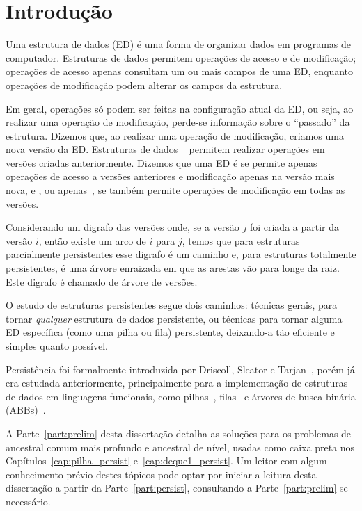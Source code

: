 \documentclass[main.tex]{subfiles}
\begin{document}
\setcounter{secnumdepth}{0}

\chapter*{Introdução}

Uma estrutura de dados (ED) é uma forma de organizar dados em programas de computador. Estruturas de dados permitem operações de acesso e de modificação; operações de acesso apenas consultam um ou mais campos de uma ED, enquanto operações de modificação podem alterar os campos da estrutura.

Em geral, operações só podem ser feitas na configuração atual da ED, ou seja, ao realizar uma operação de modificação, perde-se informação sobre o ``passado'' da estrutura. Dizemos que, ao realizar uma operação de modificação, criamos uma nova versão da ED. Estruturas de dados ~\cite{DriscollSST1989} permitem realizar operações em versões criadas anteriormente. Dizemos que uma ED é  se permite apenas operações de acesso a versões anteriores e modificação apenas na versão mais nova, e , ou apenas~, se também permite operações de modificação em todas as versões.

Considerando um digrafo das versões onde, se a versão $j$ foi criada a partir da versão $i$, então existe um arco de $i$ para $j$, temos que para estruturas parcialmente persistentes esse digrafo é um caminho e, para estruturas totalmente persistentes, é uma árvore enraizada em que as arestas vão para longe da raiz. Este digrafo é chamado de árvore de versões.

O estudo de estruturas persistentes segue dois caminhos: técnicas gerais, para tornar \emph{qualquer} estrutura de dados persistente, ou técnicas para tornar alguma ED específica (como uma pilha ou fila) persistente, deixando-a tão eficiente e simples quanto possível.

Persistência foi formalmente introduzida por Driscoll, Sleator e Tarjan~\cite{DriscollSST1989}, porém já era estudada anteriormente, principalmente para a implementação de estruturas de dados em linguagens funcionais, como pilhas~\cite{Myers83}, filas~\cite{HoodMelville} e árvores de busca binária (ABBs)~\cite{Myers82}.

A Parte~\ref{part:prelim} desta dissertação detalha as soluções para os problemas de ancestral comum mais profundo e ancestral de nível, usadas como caixa preta nos Capítulos~\ref{cap:pilha_persist} e~\ref{cap:deque1_persist}. Um leitor com algum conhecimento prévio destes tópicos pode optar por iniciar a leitura desta dissertação a partir da Parte~\ref{part:persist}, consultando a Parte~\ref{part:prelim} se necessário.
\end{document}
